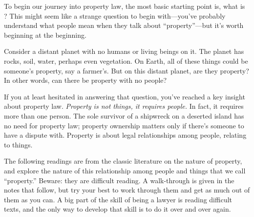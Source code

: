 To begin our journey into property law, the most basic starting point is, what
is ? This might seem like a strange question to begin
with---you've probably understand what people mean when they talk about
``property''---but it's worth beginning at the beginning.

Consider a distant planet with no humans or living beings on it. The planet has
rocks, soil, water, perhaps even vegetation. On Earth, all of these things could
be someone's property, say a farmer's. But on this distant planet, are they
property? In other words, can there be property with no people?

If you at least hesitated in answering that question, you've reached a key
insight about property law. \emph{Property is not things, it requires people.}
In fact, it requires more than one person. The sole survivor of a shipwreck on a
deserted island has no need for property law; property ownership matters only if
there's someone to have a dispute with.
Property is about legal relationships among people, relating to things.

The following readings are from the classic literature on the nature of
property, and explore the nature of this relationship among people and things
that we call ``property.'' Beware: they are difficult reading. A walk-through is
given in the notes that follow, but try your best to work through them and get
as much out of them as you can. A big part of the skill of being a lawyer is
reading difficult texts, and the only way to develop that skill is to do it over
and over again.

